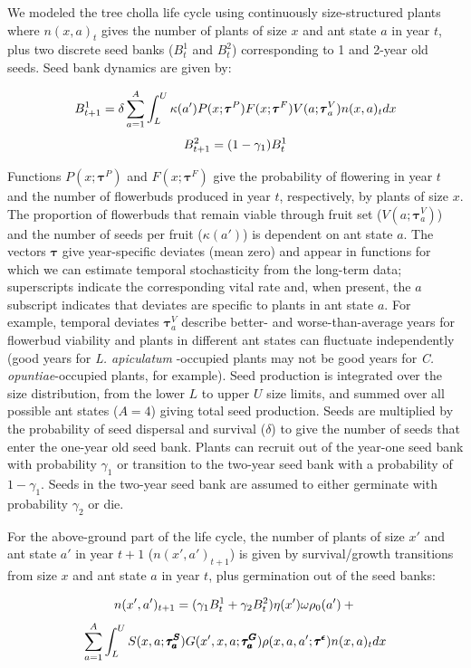 \documentclass[11pt]{article}
\begin{document}
We modeled the tree cholla life cycle using continuously size-structured plants where $n(x,a)_{t}$ gives the number of plants of size $x$  and ant state $a$ in year $t$, plus two discrete seed banks ($B^1_{t}$ and $B^2_{t}$) corresponding to 1 and 2-year old seeds. 
Seed bank dynamics are given by:

\begin{linenomath*}
	$$
	B^1_{t+1} = \delta \sum_{a=1}^{A} \int_L^U  \kappa(a') P(x;\pmb{\tau}^P) F(x;\pmb{\tau}^F) V(a;\pmb{\tau}^V_{a}) n(x,a)_{t} dx \\
	$$
	$$
	B^2_{t+1} =  (1 - \gamma_1)B^1_{t}\\
	$$
	\label{eqn:IPM1}
\end{linenomath*}

\noindent %
Functions $P(x;\pmb{\tau}^P)$ and $F(x;\pmb{\tau}^F)$ give the probability of flowering in year $t$ and the number of flowerbuds produced in year $t$, respectively, by plants of size $x$. 
The proportion of flowerbuds that remain viable through fruit set ($V(a;\pmb{\tau}^V_{a})$) and the number of seeds per fruit ($\kappa(a')$) is dependent on ant state $a$. 
The vectors $\pmb{\tau}$ give year-specific deviates (mean zero) and appear in functions for which we can estimate temporal stochasticity from the long-term data; superscripts indicate the corresponding vital rate and, when present, the $a$ subscript indicates that deviates are specific to plants in ant state $a$.
For example, temporal deviates $\pmb{\tau}^V_{a}$ describe better- and worse-than-average years for flowerbud viability and plants in different ant states can fluctuate independently (good years for \textit{L. apiculatum} -occupied plants may not be good years for \textit{C. opuntiae}-occupied plants, for example). 
Seed production is integrated over the size distribution, from the lower $L$ to upper $U$ size limits, and summed over all possible ant states ($A=4$) giving total seed production. 
Seeds are multiplied by the probability of seed dispersal and survival ($\delta$) to give the number of seeds that enter the one-year old seed bank. 
Plants can recruit out of the year-one seed bank with probability $\gamma_1$ or transition to the two-year seed bank with a probability of $1 - \gamma_1$. 
Seeds in the two-year seed bank are assumed to either germinate with probability $\gamma_2$ or die. 

For the above-ground part of the life cycle, the number of plants of size $x'$ and ant state $a'$ in year $t+1$ ($n(x',a')_{t+1}$) is given by survival/growth transitions from size $x$ and ant state $a$ in year $t$, plus germination out of the seed banks:
\begin{linenomath*}
	$$
	n(x',a')_{t+1} = (\gamma_1 B^1_{t} + \gamma_2 B^2_{t} ) \eta(x') \omega \rho_{0}(a')  + \\
	$$
	$$
	\sum_{a=1}^{A} \int_L^U S(x,a;\pmb{\tau^S_{a}}) G(x',x,a;\pmb{\tau^G_{a}}) \rho(x,a,a';\pmb{\tau^{\epsilon}}) n(x,a)_t dx \\
	$$
	\label{eqn:IPM2}
\end{linenomath*}
\end{document}
